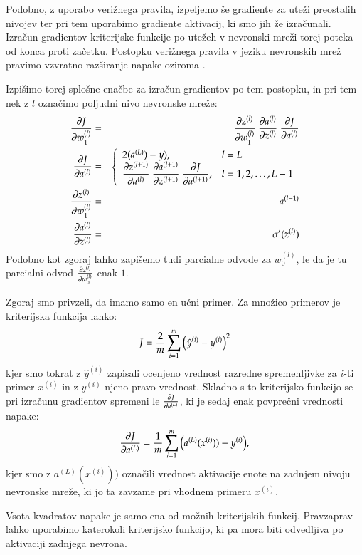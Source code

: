 Podobno, z uporabo verižnega pravila, izpeljemo še gradiente za uteži preostalih nivojev ter pri tem uporabimo gradiente aktivacij, ki smo jih že izračunali. Izračun gradientov kriterijske funkcije po utežeh v nevronski mreži torej poteka od konca proti začetku. Postopku verižnega pravila v jeziku nevronskih mrež pravimo vzvratno razširanje napake oziroma .

Izpišimo torej splošne enačbe za izračun gradientov po tem postopku, in pri tem nek z $l$ označimo poljudni nivo nevronske mreže:
\begin{eqnarray}
  \pd{J}{w_1^{(l)}} & = & \pd{z^{(l)}}{w_1^{(l)}}\ \pd{a^{(l)}}{z^{(l)}}\ \pd{J}{a^{(l)}} \\
  \pd{J}{a^{(l)}} & = & \left\{
    \begin{array}{ll}
      2(a^{(L)})-y), & l=L \\
      \displaystyle
      \pd{z^{(l+1)}}{a^{(l)}}\ \pd{a^{(l+1)}}{z^{(l+1)}}\ \pd{J}{a^{(l+1)}}, 
      & l=1,2,\ldots,L-1
    \end{array} \right. \\
  \pd{z^{(l)}}{w_1^{(l)}} & = & a^{(l-1)} \\
  \pd{a^{(l)}}{z^{(l)}} & = & \sigma'(z^{(l)})
\end{eqnarray}
\noindent Podobno kot zgoraj lahko zapišemo tudi parcialne odvode za $w_0^{(l)}$, le da je tu parcialni odvod $\frac{\partial z^{(l)}}{\partial w_0^{(l)}}$ enak $1$.

Zgoraj smo privzeli, da imamo samo en učni primer. Za množico primerov je kriterijska funkcija lahko:
\begin{equation}
J={2\over m}\sum_{i=1}^m \big( \hat{y}^{(i)} - y^{(i)}\big)^2
\end{equation}
\noindent kjer smo tokrat z $\hat{y}^{(i)}$ zapisali ocenjeno vrednost razredne spremenljivke za $i$-ti primer $x^{(i)}$ in z $y^{(i)}$ njeno pravo vrednost. Skladno s to kriterijsko funkcijo se pri izračunu gradientov spremeni le $\frac{\partial J}{\partial a^{(L)}}$, ki je sedaj enak povprečni vrednosti napake:
\begin{equation}
  \frac{\partial J}{\partial a^{(L)}} = {1\over m}\sum_{i=1}^m \big(a^{(L)}(x^{(i)}))-y^{(i)}\big),
\end{equation}
\noindent kjer smo z $a^{(L)}(x^{(i)}))$ označili vrednost aktivacije enote na zadnjem nivoju nevronske mreže, ki jo ta zavzame pri vhodnem primeru $x^{(i)}$.

Vsota kvadratov napake je samo ena od možnih kriterijskih funkcij. Pravzaprav lahko uporabimo katerokoli kriterijsko funkcijo, ki pa mora biti odvedljiva po aktivaciji zadnjega nevrona.

